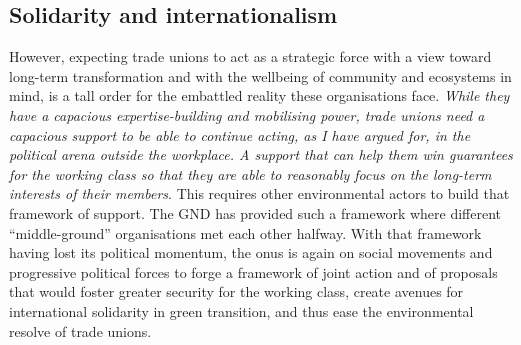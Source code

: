 \documentclass[a4paper, nobind]{templates/ociamthesis}
\begin{document}
\hypertarget{solidarity-and-internationalism}{%
\subsection{Solidarity and internationalism}\label{solidarity-and-internationalism}}

However, expecting trade unions to act as a strategic force with a view toward long-term transformation and with the wellbeing of community and ecosystems in mind, is a tall order for the embattled reality these organisations face. \emph{While they have a capacious expertise-building and mobilising power, trade unions need a capacious support to be able to continue acting, as I have argued for, in the political arena outside the workplace. A support that can help them win guarantees for the working class so that they are able to reasonably focus on the long-term interests of their members}. This requires other environmental actors to build that framework of support. The GND has provided such a framework where different ``middle-ground'' organisations met each other halfway. With that framework having lost its political momentum, the onus is again on social movements and progressive political forces to forge a framework of joint action and of proposals that would foster greater security for the working class, create avenues for international solidarity in green transition, and thus ease the environmental resolve of trade unions.
\end{document}
